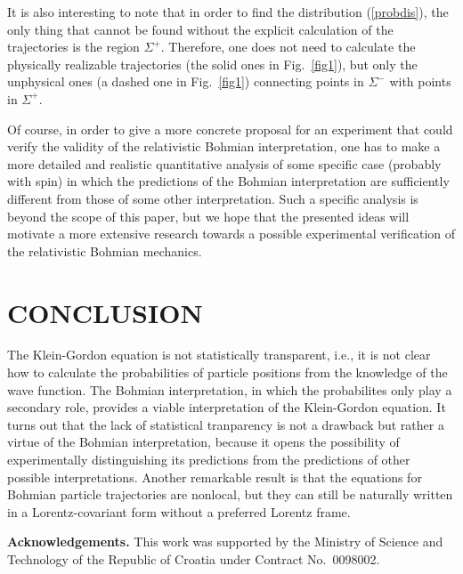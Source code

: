 \documentclass[12pt]{article}
\begin{document}
It is also interesting to note that in order to find the distribution 
(\ref{probdis}), the only thing that cannot be found without 
the explicit calculation of the trajectories is the region $\Sigma^+$.
Therefore, one does not need to calculate the physically 
realizable trajectories (the solid ones in Fig.~\ref{fig1}), but only 
the unphysical ones (a dashed one in Fig.~\ref{fig1}) connecting 
points in $\Sigma^-$ with points in $\Sigma^+$. 

Of course, in order to give a more concrete proposal for an experiment
that could verify the validity of the relativistic Bohmian interpretation,
one has to make a more detailed and realistic
quantitative analysis of some specific case (probably with spin) 
in which
the predictions of the Bohmian interpretation are sufficiently different
from those of some other interpretation. Such a specific
analysis is beyond the scope of this paper, but
we hope that the presented ideas will motivate a more extensive research
towards a possible experimental verification of the relativistic
Bohmian mechanics.  


\section{CONCLUSION}
\label{secCon}

The Klein-Gordon equation is not statistically transparent, 
i.e., it is not clear how to calculate the probabilities 
of particle positions from the knowledge of the wave function.
The Bohmian interpretation, in which the probabilites only play 
a secondary role, provides a viable interpretation 
of the Klein-Gordon equation. It turns out that the 
lack of statistical 
tranparency is not a drawback but rather a virtue of 
the Bohmian interpretation, because it opens the possibility 
of experimentally distinguishing its predictions 
from the predictions of other possible interpretations. 
Another remarkable result is that 
the equations for Bohmian particle trajectories 
are nonlocal, but they can still be naturally  
written in a Lorentz-covariant 
form without a preferred Lorentz frame.  

\vspace{0.4cm}
\noindent
{\bf Acknowledgements.}
This work was supported by the Ministry of Science and Technology of the
Republic of Croatia under Contract No.~0098002.
\end{document}
